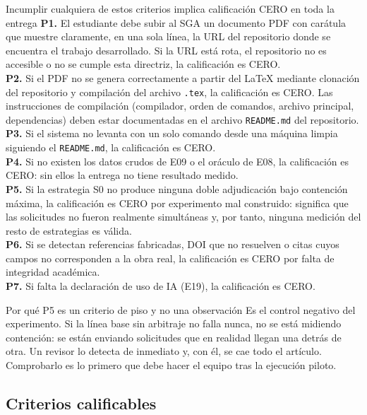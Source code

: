 \documentclass[11pt,a4paper]{article}
\begin{document}
\begin{alerta}{Incumplir cualquiera de estos criterios implica calificación CERO en toda la entrega}
	\textbf{P1.} El estudiante debe subir al SGA un documento PDF con carátula que muestre claramente, en una sola línea, la URL del repositorio donde se encuentra el trabajo desarrollado. Si la URL está rota, el repositorio no es accesible o no se cumple esta directriz, la calificación es CERO.\\[6pt]
	\textbf{P2.} Si el PDF no se genera correctamente a partir del LaTeX mediante clonación del repositorio y compilación del archivo \texttt{.tex}, la calificación es CERO. Las instrucciones de compilación (compilador, orden de comandos, archivo principal, dependencias) deben estar documentadas en el archivo \texttt{README.md} del repositorio.\\[6pt]
	\textbf{P3.} Si el sistema no levanta con un solo comando desde una máquina limpia siguiendo el \texttt{README.md}, la calificación es CERO.\\[6pt]
	\textbf{P4.} Si no existen los datos crudos de E09 o el oráculo de E08, la calificación es CERO: sin ellos la entrega no tiene resultado medido.\\[6pt]
	\textbf{P5.} Si la estrategia S0 no produce ninguna doble adjudicación bajo contención máxima, la calificación es CERO por experimento mal construido: significa que las solicitudes no fueron realmente simultáneas y, por tanto, ninguna medición del resto de estrategias es válida.\\[6pt]
	\textbf{P6.} Si se detectan referencias fabricadas, DOI que no resuelven o citas cuyos campos no corresponden a la obra real, la calificación es CERO por falta de integridad académica.\\[6pt]
	\textbf{P7.} Si falta la declaración de uso de IA (E19), la calificación es CERO.
\end{alerta}

\begin{aviso}{Por qué P5 es un criterio de piso y no una observación}
	Es el control negativo del experimento. Si la línea base sin arbitraje no falla nunca, no se está midiendo contención: se están enviando solicitudes que en realidad llegan una detrás de otra. Un revisor lo detecta de inmediato y, con él, se cae todo el artículo. Comprobarlo es lo primero que debe hacer el equipo tras la ejecución piloto.
\end{aviso}

\subsection{Criterios calificables}
\end{document}
